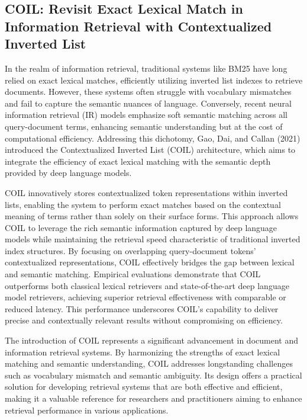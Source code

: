 \subsection{COIL: Revisit Exact Lexical Match in Information Retrieval with Contextualized Inverted List}

\noindent In the realm of information retrieval, traditional systems like BM25 have long relied on exact lexical matches, efficiently utilizing inverted list indexes to retrieve documents. However, these systems often struggle with vocabulary mismatches and fail to capture the semantic nuances of language. Conversely, recent neural information retrieval (IR) models emphasize soft semantic matching across all query-document terms, enhancing semantic understanding but at the cost of computational efficiency. Addressing this dichotomy, Gao, Dai, and Callan (2021) introduced the Contextualized Inverted List (COIL) architecture, which aims to integrate the efficiency of exact lexical matching with the semantic depth provided by deep language models.

COIL innovatively stores contextualized token representations within inverted lists, enabling the system to perform exact matches based on the contextual meaning of terms rather than solely on their surface forms. This approach allows COIL to leverage the rich semantic information captured by deep language models while maintaining the retrieval speed characteristic of traditional inverted index structures. By focusing on overlapping query-document tokens' contextualized representations, COIL effectively bridges the gap between lexical and semantic matching. Empirical evaluations demonstrate that COIL outperforms both classical lexical retrievers and state-of-the-art deep language model retrievers, achieving superior retrieval effectiveness with comparable or reduced latency. This performance underscores COIL's capability to deliver precise and contextually relevant results without compromising on efficiency.

The introduction of COIL represents a significant advancement in document and information retrieval systems. By harmonizing the strengths of exact lexical matching and semantic understanding, COIL addresses longstanding challenges such as vocabulary mismatch and semantic ambiguity. Its design offers a practical solution for developing retrieval systems that are both effective and efficient, making it a valuable reference for researchers and practitioners aiming to enhance retrieval performance in various applications.

